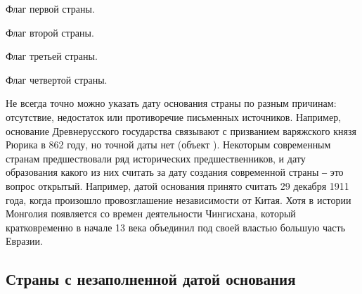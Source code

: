 \begin{marginfigure}[0.0cm]
	{
		\setlength{\fboxsep}{0pt}%
		\setlength{\fboxrule}{1pt}%
	}
	\caption{Флаг первой страны.}%
	\label{fig:flag_kor}%
\end{marginfigure}
\begin{marginfigure}[0.0cm]
	{
		\setlength{\fboxsep}{0pt}%
		\setlength{\fboxrule}{1pt}%
	}
	\caption{Флаг второй страны.}%
	\label{fig:flag_singapore}%
\end{marginfigure}
\begin{marginfigure}[0.0cm]
	{
		\setlength{\fboxsep}{0pt}%
		\setlength{\fboxrule}{1pt}%
	}
	\caption{Флаг третьей страны.}%
	\label{fig:flag_israel}%
\end{marginfigure}
\begin{marginfigure}[0.0cm]
	{
		\setlength{\fboxsep}{0pt}%
		\setlength{\fboxrule}{1pt}%
	}
	\caption{Флаг четвертой страны.}%
	\label{fig:flag_mongolia}%
\end{marginfigure}

Не всегда точно можно  указать дату основания страны по разным причинам: отсутствие, недостаток или противоречие письменных источников. Например, основание Древнерусского государства связывают с призванием варяжского князя Рюрика в 862 году, но точной даты нет (объект ). Некоторым современным странам предшествовали ряд исторических предшественников, и дату образования какого из них считать за дату создания современной страны ‒ это вопрос открытый. Например, датой основания  принято считать 29 декабря 1911 года, когда произошло провозглашение независимости от Китая. Хотя в истории Монголия появляется со времен деятельности Чингисхана, который кратковременно в начале 13 века объединил под своей властью большую часть Евразии.



\subsection{Страны с незаполненной датой основания}


